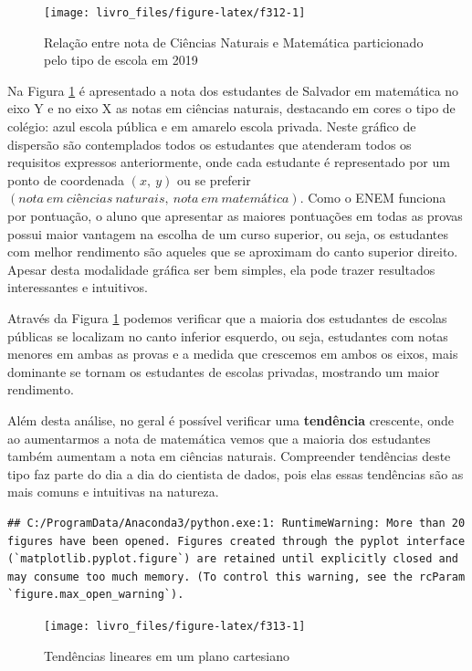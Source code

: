 \documentclass[
  oneside]{book}
\begin{document}
\begin{figure}

{\centering \texttt{[image: livro\_files/figure-latex/f312-1]} 

}

\caption{Relação entre nota de Ciências Naturais e Matemática particionado pelo tipo de escola em 2019}\label{fig:f312}
\end{figure}

Na Figura \ref{fig:f312} é apresentado a nota dos estudantes de Salvador em matemática no eixo Y e no eixo X as notas em ciências naturais, destacando em cores o tipo de colégio: azul escola pública e em amarelo escola privada. Neste gráfico de dispersão são contemplados todos os estudantes que atenderam todos os requisitos expressos anteriormente, onde cada estudante é representado por um ponto de coordenada \((x,\ y)\) ou se preferir \((nota\ em\ ciências\ naturais,\ nota\ em\ matemática)\). Como o ENEM funciona por pontuação, o aluno que apresentar as maiores pontuações em todas as provas possui maior vantagem na escolha de um curso superior, ou seja, os estudantes com melhor rendimento são aqueles que se aproximam do canto superior direito. Apesar desta modalidade gráfica ser bem simples, ela pode trazer resultados interessantes e intuitivos.

Através da Figura \ref{fig:f312} podemos verificar que a maioria dos estudantes de escolas públicas se localizam no canto inferior esquerdo, ou seja, estudantes com notas menores em ambas as provas e a medida que crescemos em ambos os eixos, mais dominante se tornam os estudantes de escolas privadas, mostrando um maior rendimento.

Além desta análise, no geral é possível verificar uma \textbf{tendência} crescente, onde ao aumentarmos a nota de matemática vemos que a maioria dos estudantes também aumentam a nota em ciências naturais. Compreender tendências deste tipo faz parte do dia a dia do cientista de dados, pois elas essas tendências são as mais comuns e intuitivas na natureza.

\begin{verbatim}
## C:/ProgramData/Anaconda3/python.exe:1: RuntimeWarning: More than 20 figures have been opened. Figures created through the pyplot interface (`matplotlib.pyplot.figure`) are retained until explicitly closed and may consume too much memory. (To control this warning, see the rcParam `figure.max_open_warning`).
\end{verbatim}

\begin{figure}

{\centering \texttt{[image: livro\_files/figure-latex/f313-1]} 

}

\caption{Tendências lineares em um plano cartesiano}\label{fig:f313}
\end{figure}
\end{document}

